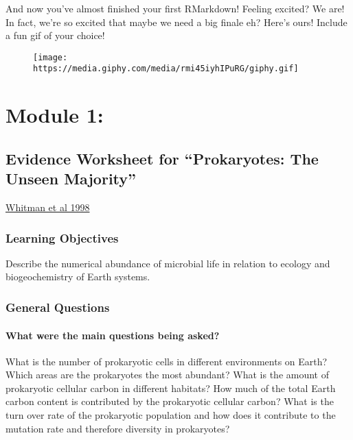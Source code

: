 \documentclass[]{article}
\let\oldparagraph\paragraph
\renewcommand{\paragraph}[1]{\oldparagraph{#1}\mbox{}}
\begin{document}
And now you've almost finished your first RMarkdown! Feeling excited? We
are! In fact, we're so excited that maybe we need a big finale eh?
Here's ours! Include a fun gif of your choice!

\begin{figure}
\centering
\texttt{[image: https://media.giphy.com/media/rmi45iyhIPuRG/giphy.gif]}
\caption{}
\end{figure}

\section{Module 1:}\label{module-1}

\subsection{\texorpdfstring{Evidence Worksheet for ``Prokaryotes: The
Unseen
Majority''}{Evidence Worksheet for Prokaryotes: The Unseen Majority}}\label{evidence-worksheet-for-prokaryotes-the-unseen-majority}

\href{https://www.ncbi.nlm.nih.gov/pmc/articles/PMC33863/}{Whitman et al
1998}

\subsubsection{Learning Objectives}\label{learning-objectives}

Describe the numerical abundance of microbial life in relation to
ecology and biogeochemistry of Earth systems.

\subsubsection{General Questions}\label{general-questions}

\paragraph{What were the main questions being
asked?}\label{what-were-the-main-questions-being-asked}

What is the number of prokaryotic cells in different environments on
Earth? Which areas are the prokaryotes the most abundant? What is the
amount of prokaryotic cellular carbon in different habitats? How much of
the total Earth carbon content is contributed by the prokaryotic
cellular carbon? What is the turn over rate of the prokaryotic
population and how does it contribute to the mutation rate and therefore
diversity in prokaryotes?
\end{document}
